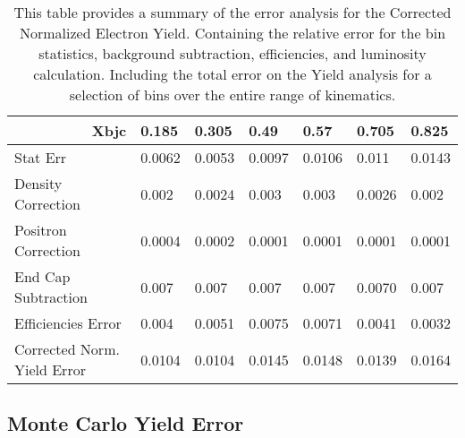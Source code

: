 \begin{table}[]
	\caption{This table provides a summary of the error analysis for the Corrected Normalized Electron Yield. Containing the relative error for the bin statistics, background subtraction, efficiencies, and luminosity calculation. Including the total error on the Yield analysis for a selection of bins over the entire range of kinematics.  }
	\label{Y_Etable}
	\begin{tabular}{|l|l|l|l|l|l|l|}
		\hline
		\multicolumn{1}{|r|}{\textbf{Xbjc}} & \textbf{0.185} & \textbf{0.305} & \textbf{0.49} & \textbf{0.57} & \textbf{0.705} & \textbf{0.825} \\ \hline
		Stat Err                            & 0.0062         & 0.0053         & 0.0097        & 0.0106        & 0.011          & 0.0143         \\ \hline
		Density Correction             & 0.002          & 0.0024         & 0.003         & 0.003         & 0.0026         & 0.002          \\ \hline
		Positron Correction            & 0.0004         & 0.0002         & 0.0001        & 0.0001        & 0.0001         & 0.0001         \\ \hline
		End Cap Subtraction            & 0.007          & 0.007          & 0.007         & 0.007         & 0.0070         & 0.007          \\ \hline
		Efficiencies Error             & 0.004          & 0.0051         & 0.0075        & 0.0071        & 0.0041         & 0.0032         \\ \hline
		Corrected Norm. Yield Error    & 0.0104         & 0.0104         & 0.0145        & 0.0148        & 0.0139         & 0.0164         \\ \hline
	\end{tabular}
\end{table}

\subsection{Monte Carlo Yield Error}
